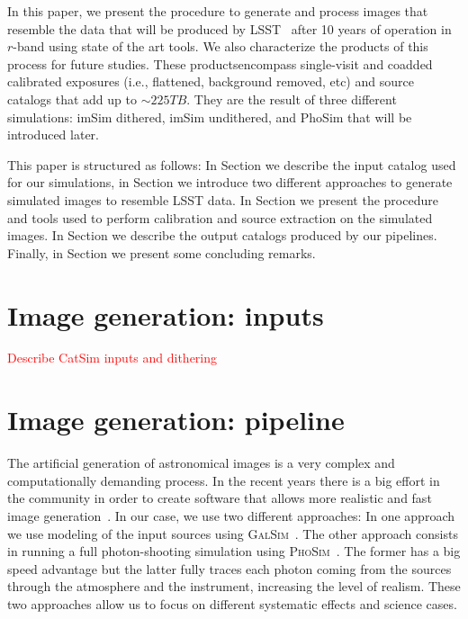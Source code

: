 \documentclass[\docopts]{\docclass}
\begin{document}
In this paper, we present the procedure to generate and process images that resemble the data that will be produced by LSST~\citep{2008arXiv0805.2366I} after 10 years of operation in $r$-band using state of the art tools. We also characterize the products of this process for future studies. These productsencompass single-visit and coadded calibrated exposures (i.e., flattened, background removed, etc) and source catalogs that add up to $\sim 225 TB$. They are the result of three different simulations: imSim dithered, imSim undithered, and PhoSim that will be introduced later.

This paper is structured as follows: In Section  we describe the input catalog used for our simulations, in Section  we introduce two different approaches to generate simulated images to resemble LSST data. In Section  we present the procedure and tools used to perform calibration and source extraction on the simulated images. In Section  we describe the output catalogs produced by our pipelines. Finally, in Section  we present some concluding remarks.

\section{Image generation: inputs}
\label{sec:inputs}

\textcolor{red}{Describe CatSim inputs and dithering}

\section{Image generation: pipeline}
\label{sec:image_generation_pipeline}

The artificial generation of astronomical images is a very complex and computationally demanding process. In the recent years there is a big effort in the community in order to create software that allows more realistic and fast image generation~\citep{2016MNRAS.457..786S,2016ApJ...817...25B}. In our case, we use two different approaches: In one approach we use modeling of the input sources using \textsc{GalSim}~\citep{2015A&C....10..121R}. The other approach consists in running a full photon-shooting simulation using \textsc{PhoSim}~\citep{2015ApJS..218...14P}. The former has a big speed advantage but the latter fully traces each photon coming from the sources through the atmosphere and the instrument, increasing the level of realism. These two approaches allow us to focus on different systematic effects and science cases.
  
\end{document}
